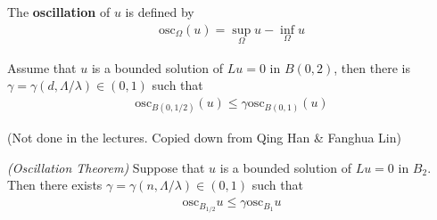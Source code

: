 \documentclass[12pt,a4paper]{article}
\begin{document}
 The \textbf{oscillation} of $u$ is defined by
\begin{align*}
\text{osc}_{\Omega}(u) = \sup_{\Omega} u - \inf_{\Omega} u
\end{align*}
\s

\prop Assume that $u$ is a bounded solution of $Lu=0$ in $B(0, 2)$, then there is $\gamma = \gamma(d, \Lambda/\lambda) \in (0,1)$ such that
\begin{align*}
\text{osc}_{B(0, 1/2)}(u) \leq \gamma \text{osc}_{B(0,1)}(u)
\end{align*}
\s

\newday

(Not done in the lectures. Copied down from Qing Han \& Fanghua Lin)
\s

 \emph{(Oscillation Theorem)} Suppose that $u$ is a bounded solution of $Lu=0$ in $B_2$. Then there exists $\gamma =\gamma(n, \Lambda/\lambda)\in(0,1)$ such that
\begin{align*}
\text{osc}_{B_{1/2}}u \leq \gamma \text{osc}_{B_1} u
\end{align*}
\end{document}
